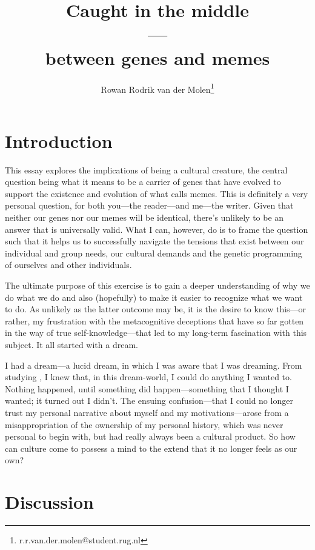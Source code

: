 \documentclass{article}
\title{Caught in the middle\\---\\between genes and memes}
\author{Rowan Rodrik van der Molen\footnote{r.r.van.der.molen@student.rug.nl}}
\begin{document}
\maketitle

\tableofcontents

\section{Introduction}
\label{sec:intro}

This essay explores the implications of being a cultural creature, the central
question being what it means to be a carrier of genes that have evolved to support
the existence and evolution of what \citet{dawkins1976} calls memes. This is
definitely a very personal question, for both you---the reader---and me---the
writer. Given that neither our genes nor our memes will be identical, there's
unlikely to be an answer that is universally valid. What I can, however, do is
to frame the question such that it helps us to successfully navigate the
tensions that exist between our individual and group needs, our cultural
demands and the genetic programming of ourselves and other individuals.

The ultimate purpose of this exercise is to gain a deeper understanding of why
we do what we do and also (hopefully) to make it easier to recognize what
we want to do. As unlikely as the latter outcome may be, it is the desire to
know this---or rather, my frustration with the metacognitive deceptions that
have so far gotten in the way of true self-knowledge---that led to my long-term
fascination with this subject. It all started with a dream.

I had a dream---a lucid dream, in which I was aware that I was dreaming. From
studying \citet{laberge1990}, I knew that, in this dream-world, I could do
anything I wanted to. Nothing happened, until something did happen---something
that I thought I wanted; it turned out I didn't. The ensuing confusion---that I
could no longer trust my personal narrative about myself and my
motivations---arose from a misappropriation of the ownership of my personal
history, which was never personal to begin with, but had really always been a
cultural product. So how can culture come to possess a mind to the extend that
it no longer feels as our own?

\section{Discussion}
\end{document}
